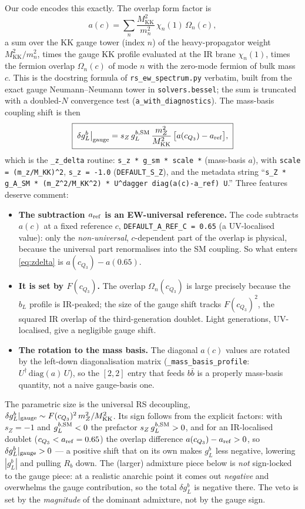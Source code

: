 \documentclass[11pt]{article}
\newcommand{\MKK}{M_{\mathrm{KK}}}
\newcommand{\code}[1]{\texttt{#1}}
\newcommand{\gL}{g_L^b}
\newcommand{\dgL}{\delta g_L^b}
\theoremstyle{definition}
\begin{document}
Our code encodes this exactly. The overlap form factor is
\begin{equation}
a(c) = \sum_n \frac{\MKK^2}{m_n^2}\,\chi_n(1)\,\Omega_n(c),
\label{eq:ac}
\end{equation}
a sum over the KK gauge tower (index $n$) of the heavy-propagator weight
$\MKK^2/m_n^2$, times the gauge KK profile evaluated at the IR brane
$\chi_n(1)$, times the fermion overlap $\Omega_n(c)$ of mode $n$ with the
zero-mode fermion of bulk mass $c$. This is the docstring formula of
\code{rs\_ew\_spectrum.py} verbatim, built from the exact gauge Neumann--Neumann
tower in \code{solvers.bessel}; the sum is truncated with a doubled-$N$
convergence test (\code{a\_with\_diagnostics}). The mass-basis coupling shift is
then
\begin{equation}
\boxed{\;\dgL\big|_{\rm gauge} = s_Z\,g_L^{b,\rm SM}\,\frac{m_Z^2}{\MKK^2}\,
\big[a(c_{Q_3}) - a_{\rm ref}\big],\;}
\label{eq:zdelta}
\end{equation}
which is the \code{\_z\_delta} routine: \code{s\_z * g\_sm * scale *}
(mass-basis $a$), with \code{scale = (m\_z/M\_KK)\^{}2}, \code{s\_z = -1.0}
(\code{DEFAULT\_S\_Z}), and the metadata string ``\code{s\_Z * g\_A\_SM *
(m\_Z\^{}2/M\_KK\^{}2) * U\^{}dagger diag(a(c)-a\_ref) U}.'' Three features deserve
comment:
\begin{itemize}[leftmargin=1.4em]
\item \textbf{The subtraction $a_{\rm ref}$ is an EW-universal reference.} The
code subtracts $a(c)$ at a fixed reference $c$, \code{DEFAULT\_A\_REF\_C = 0.65}
(a UV-localised value): only the \emph{non-universal}, $c$-dependent part of the
overlap is physical, because the universal part renormalises into the SM
coupling. So what enters \eqref{eq:zdelta} is $a(c_{Q_3})-a(0.65)$.
\item \textbf{It is set by $F(c_{Q_3})$.} The overlap $\Omega_n(c_{Q_3})$ is
large precisely because the $b_L$ profile is IR-peaked; the size of the gauge
shift tracks $F(c_{Q_3})^2$, the squared IR overlap of the third-generation
doublet. Light generations, UV-localised, give a negligible gauge shift.
\item \textbf{The rotation to the mass basis.} The diagonal $a(c)$ values are
rotated by the left-down diagonalisation matrix
(\code{\_mass\_basis\_profile}: $U^\dagger \,\mathrm{diag}(a)\,U$), so the
$[2,2]$ entry that feeds $b\bar b$ is a properly mass-basis quantity, not a
naive gauge-basis one.
\end{itemize}
The parametric size is the universal RS decoupling, $\dgL|_{\rm gauge}\sim
F(c_{Q_3})^2\, m_Z^2/\MKK^2$. Its sign follows from the explicit factors: with
$s_Z=-1$ and $g_L^{b,\rm SM}<0$ the prefactor $s_Z\,g_L^{b,\rm SM}>0$, and for an
IR-localised doublet ($c_{Q_3}<a_{\rm ref}=0.65$) the overlap difference
$a(c_{Q_3})-a_{\rm ref}>0$, so $\dgL|_{\rm gauge}>0$ --- a positive shift that
on its own makes $\gL$ less negative, lowering $|\gL|$ and pulling $R_b$ down. The
(larger) admixture piece below is \emph{not} sign-locked to the gauge piece: at a
realistic anarchic point it comes out \emph{negative} and overwhelms the gauge
contribution, so the total $\dgL$ is negative there. The veto is set by the
\emph{magnitude} of the dominant admixture, not by the gauge sign.
\end{document}
